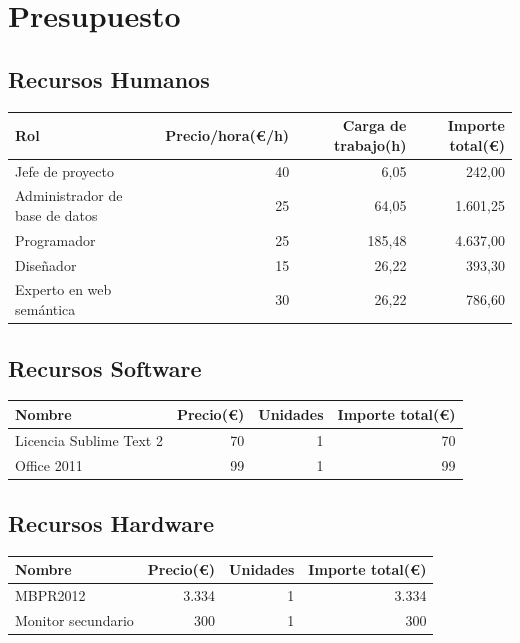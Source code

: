 \chapter{Presupuesto}

\section{Recursos Humanos}

\begin{center}
	\begin{tabular}{| l | r | r | r |}
		\hline
		Rol					&	Precio/hora(\euro/h)	&	Carga de trabajo(h)	&	Importe total(\euro)	\\	\hline
		Jefe de proyecto	& 	40						&	6,05 					& 	242,00				\\	\hline
		Administrador de base de datos &	25			&	64,05					&	1.601,25			\\	\hline
		Programador			&	25						&	185,48					&	4.637,00			\\	\hline
		Diseñador			&	15						&	26,22					&	393,30				\\	\hline
		Experto en web semántica	&		30			&	26,22					&	786,60				\\
		\hline
	\end{tabular}
\end{center}

\section{Recursos Software}

\begin{center}
	\begin{tabular}{| l | r | r | r |}
		\hline
		Nombre					&	Precio(\euro)	&	Unidades	&	Importe total(\euro)	\\	\hline
		Licencia Sublime Text 2	& 	70				&	1 			& 	70						\\	\hline
		Office 2011 			&	99				&	1			&	99						\\
		\hline
	\end{tabular}
\end{center}

\section{Recursos Hardware}

\begin{center}
	\begin{tabular}{| l | r | r | r |}
		\hline
		Nombre				&	Precio(\euro)	&	Unidades	&	Importe total(\euro)	\\	\hline
		MBPR2012			& 	3.334			&	1 			&	3.334					\\	\hline
		Monitor secundario	&	300				&	1			&	300						\\
		\hline
	\end{tabular}
\end{center}

